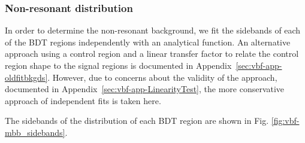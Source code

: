 \label{sec:vbf-nonres}
\subsubsection{Non-resonant \Mbb{} distribution}
In order to determine the non-resonant background, we fit  the sidebands of each of the BDT regions independently with an analytical function. An alternative approach  using a control region and a linear transfer factor to relate the control region shape to the signal regions is documented in Appendix~\ref{sec:vbf-app-oldfitbkgds}.  However, due to concerns about the validity of the approach, documented in Appendix~\ref{sec:vbf-app-LinearityTest}, the more conservative approach of independent fits is taken here.  

The sidebands of the \Mbb{}  distribution of each BDT region are shown in Fig. \ref{fig:vbf-mbb_sidebands}.

